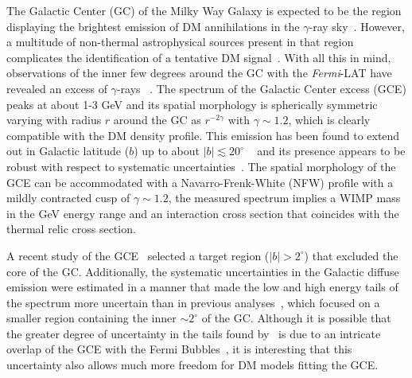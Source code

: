 The Galactic Center (GC) of the Milky Way Galaxy is expected to be the region displaying the brightest emission of DM annihilations in the $\gamma$-ray sky~\cite{Funk:review}.
However, a multitude of non-thermal astrophysical sources present in that region complicates the identification of a tentative DM signal~\cite{Funk:review}. 
With all this in mind, observations of the inner few degrees around the GC with the \textit{Fermi}-LAT have revealed an excess of $\gamma$-rays ~\cite{Goodenough2009gk,Vitale:2009hr,Hooper:2010mq,hooper,AbazajianKaplinghat2012,AbazajianKaplinghat2013,GordonMacias2013}. 
The spectrum of the Galactic Center excess (GCE) peaks at about 1-3 GeV and its spatial morphology is spherically symmetric varying with radius $r$ around the GC as $r^{-2\gamma}$ with  $\gamma\sim 1.2$, which is clearly compatible with the DM density profile. 
%
This emission has been found to extend out in Galactic latitude ($b$) up to about $|b|\lesssim 20^\circ$ ~\cite{hooperslatyer2013,Daylan:2014,CaloreCholisWeniger2015,TheFermi-LAT:2015kwa} and its presence appears  to be robust with respect to systematic uncertainties~\cite{GordonMacias2013,MaciasGordon2014,Daylan:2014,Zho2015,CaloreCholisWeniger2015,PorterMurgia2015,TheFermi-LAT:2015kwa}.
%
The spatial morphology of the GCE can be accommodated with a Navarro-Frenk-White (NFW) profile with a mildly contracted cusp of $\gamma\sim 1.2$, the measured spectrum implies a WIMP mass in the GeV energy range and an interaction cross section that coincides with the thermal relic cross section. 

A recent study of the GCE~\cite{CaloreCholisWeniger2015} selected a target region ($|b|>2^\circ$) that excluded the core of the GC. Additionally, the systematic uncertainties in the Galactic diffuse emission were estimated in a manner that made the low and high energy tails of the spectrum more uncertain than in previous analyses~\cite{GordonMacias2013,MaciasGordon2014,Abazajian2014,Daylan:2014}, which focused on a smaller region containing the inner $\sim 2^\circ$ of the GC. Although it is possible that the greater degree of uncertainty in the tails found by~\cite{CaloreCholisWeniger2015} is due to an intricate overlap of the GCE with the Fermi Bubbles~\cite{suslatyerfinkbeiner2010,Fermi-LAT:AnnaFranckowiak}, it is interesting that this uncertainty also allows much more freedom for DM models fitting the GCE.


